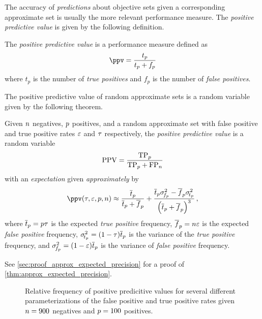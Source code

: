 \documentclass[10pt,final,hidelinks]{article}
\numberwithin{equation}{section}
\begin{document}
The accuracy of \emph{predictions} about objective sets given a corresponding approximate set is usually the more relevant performance measure.
The \emph{positive predictive value} is given by the following definition.
\begin{definition}
	The \emph{positive predictive value} is a performance measure defined as
	\begin{equation}
	\ppv = \frac{t_p}{t_p + f_p}
	\end{equation}
	where $t_p$ is the number of \emph{true positives} and $f_p$ is the number of \emph{false positives}.
\end{definition}

The positive predictive value of random approximate sets is a random variable given by the following theorem.
\begin{theorem}
	\label{thm:approx_expected_precision}
	Given $n$ negatives, $p$ positives, and a random approximate set with false positive and true positive rates $\varepsilon$ and $\tau$ respectively, the \emph{positive predictive value} is a random variable
	\begin{equation}
	\mathrm{PPV} = \frac{\mathrm{TP}_{p}}{\mathrm{TP}_{p} + \mathrm{FP}_{n}}
	\end{equation}
	with an \emph{expectation} given \emph{approximately} by
	\begin{equation}
	\label{eq:approx_expected_precision}
	\ppv(\tprate, \fprate, \p, \n) \approx 
	\frac{\overline{t}_\p}{\overline{t}_\p + \overline{f}_\p} +
	\frac{\overline{t}_\p \sigma_{\!f_\p}^2 - \overline{f}_\p 
		\sigma_{\!t_\p}^2}{\left(\overline{t}_\p + \overline{f}_\p\right)^3}\,,
	\end{equation}
	where $\overline{t}_p = p \tau$ is the expected \emph{true positive} frequency, $\overline{f}_p =  n \varepsilon$ is the expected \emph{false positive} frequency, $\sigma_{\!t_p}^2 = (1-\tau) \overline{t}_p$ is the variance of the \emph{true positive} frequency, and $\sigma_{\!f_p}^2 = (1-\varepsilon) \overline{t}_p$ is the variance of \emph{false positive} frequency.
\end{theorem}
See \cref{sec:proof_approx_expected_precision} for a proof of 
\cref{thm:approx_expected_precision}.

\begin{figure}
	\def\svgwidth{\columnwidth/2}
	\centering
	\captionsetup{justification=centering}
	\caption
	{
		Relative frequency of positive predicitive values for several different parameterizations of the false positive and true positive rates given $n = 900$ negatives and $p=100$ positives.
	}    
	
	\label{fig:prec_vs_fprate_and_fnrate}
\end{figure}
\end{document}
